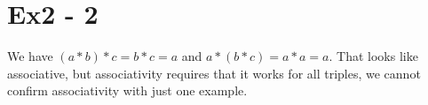 \section*{Ex2 - 2}
We have $ (a * b) * c = b * c = a $ and $ a * (b * c) = a * a = a $. That looks like associative, but associativity requires that it works for all triples, we cannot confirm associativity with just one example.